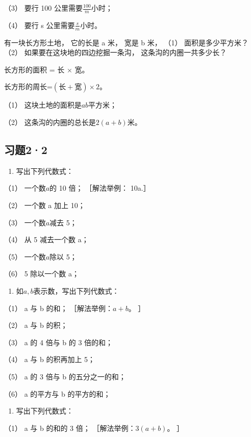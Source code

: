 （3） 要行 100 公里需要\(\frac{100}{m}\)小时；

（4） 要行 s 公里需要\(\frac{s}{m}\)小时。

 有一块长方形土地， 它的长是 a 米， 宽是 b 米， （1）
面积是多少平方米？ （2） 如果要在这块地的四边挖掘一条沟，
这条沟的内圈一共多少长？

 长方形的面积 = 长 × 宽。

长方形的周长=\((\text{长}+\text{宽})\times2\)。

 （1） 这块土地的面积是\(ab\)平方米；

（2） 这条沟的内圈的总长是\(2(a + b)\)米。

\subsection{习题2·2}

\begin{enumerate}
\item
  写出下列代数式：
\end{enumerate}

（1） 一个数\(a\)的 10 倍； ［解法举例： 10a.］

（2） 一个数 a 加上 10；

（3） 一个数\(a\)减去 5；

（4） 从 5 减去一个数 a；

（5） 一个数\(a\)除以 5；

（6） 5 除以一个数 a；

\begin{enumerate}[start=2]
\item
  如\(a, b\)表示数，写出下列代数式：
\end{enumerate}

（1） a 与 b 的和； ［解法举例：\(a + b\)。 ］

（2） a 与 b 的积；

（3） a 的 4 倍与 b 的 3 倍的和；

（4） a 与 b 的积再加上 5；

（5） a 的 3 倍与 b 的五分之一的和；

（6） a 的平方与 b 的平方的和；

\begin{enumerate}[start=3]
\item
  写出下列代数式：
\end{enumerate}

（1） a 与 b 的和的 3 倍； ［解法举例：\(3(a+b)\)。 ］

